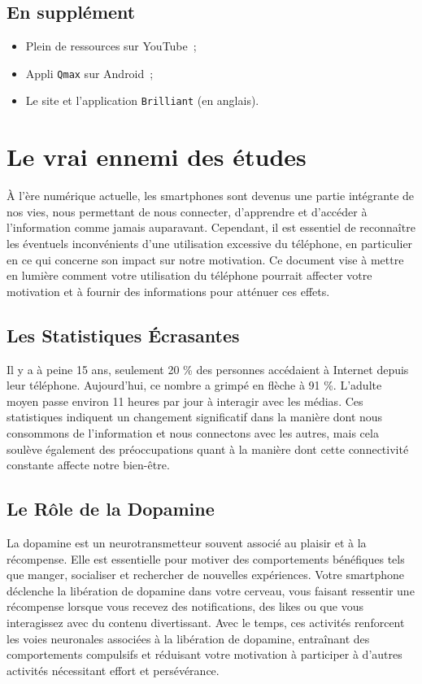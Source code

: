 \documentclass[a4paper, 10pt, final, garamond]{book}
\begin{document}
\subsection{En supplément}

\begin{itemize}
	\item Plein de ressources sur YouTube~;
	\item Appli \texttt{Qmax} sur Android~;
	\item Le site et l'application \texttt{Brilliant} (en anglais).
\end{itemize}

\section{Le vrai ennemi des études}

À l'ère numérique actuelle, les smartphones sont devenus une partie intégrante
de nos vies, nous permettant de nous connecter, d'apprendre et d'accéder à
l'information comme jamais auparavant. Cependant, il est essentiel de
reconnaître les éventuels inconvénients d'une utilisation excessive du
téléphone, en particulier en ce qui concerne son impact sur notre motivation. Ce
document vise à mettre en lumière comment votre utilisation du téléphone
pourrait affecter votre motivation et à fournir des informations pour atténuer
ces effets.

\subsection{Les Statistiques Écrasantes}

Il y a à peine 15 ans, seulement 20 \% des personnes accédaient à Internet
depuis leur téléphone. Aujourd'hui, ce nombre a grimpé en flèche à 91 \%.
L'adulte moyen passe environ 11 heures par jour à interagir avec les médias. Ces
statistiques indiquent un changement significatif dans la manière dont nous
consommons de l'information et nous connectons avec les autres, mais cela
soulève également des préoccupations quant à la manière dont cette connectivité
constante affecte notre bien-être.

\subsection{Le Rôle de la Dopamine}

La dopamine est un neurotransmetteur souvent associé au plaisir et à la
récompense. Elle est essentielle pour motiver des comportements bénéfiques tels
que manger, socialiser et rechercher de nouvelles expériences. Votre smartphone
déclenche la libération de dopamine dans votre cerveau, vous faisant ressentir
une récompense lorsque vous recevez des notifications, des likes ou que vous
interagissez avec du contenu divertissant. Avec le temps, ces activités
renforcent les voies neuronales associées à la libération de dopamine,
entraînant des comportements compulsifs et réduisant votre motivation à
participer à d'autres activités nécessitant effort et persévérance.
\end{document}
